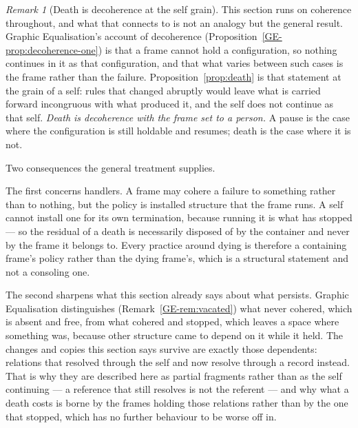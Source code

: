 \documentclass[11pt,a4paper]{article}
\theoremstyle{remark}\newtheorem{remark}[definition]{Remark}
\begin{document}
\begin{remark}[Death is decoherence at the self grain]\label{rem:death-decoherence}
This section runs on coherence throughout, and what that connects to is not an analogy but the
general result. Graphic Equalisation's account of decoherence
(Proposition~\ref{GE-prop:decoherence-one}) is that
a frame cannot hold a configuration, so nothing continues in it as that configuration, and that what
varies between such cases is the frame rather than the failure. Proposition~\ref{prop:death} is that
statement at the grain of a self: rules that changed abruptly would leave what is carried forward
incongruous with what produced it, and the self does not continue as that self. \emph{Death is
decoherence with the frame set to a person.} A pause is the case where the configuration is still
holdable and resumes; death is the case where it is not.

Two consequences the general treatment supplies.

The first concerns handlers. A frame may cohere a failure to something rather than to nothing, but the
policy is installed structure that the frame runs. A self cannot install one for its own termination,
because running it is what has stopped --- so the residual of a death is necessarily disposed of by the
container and never by the frame it belongs to. Every practice around dying is therefore a containing
frame's policy rather than the dying frame's, which is a structural statement and not a consoling one.

The second sharpens what this section already says about what persists. Graphic Equalisation
distinguishes (Remark~\ref{GE-rem:vacated})
what never cohered, which is absent and free, from what cohered and stopped, which leaves a space where
something was, because other structure came to depend on it while it held. The changes and copies this
section says survive are exactly those dependents: relations that resolved through the self and now
resolve through a record instead. That is why they are described here as partial fragments rather than
as the self continuing --- a reference that still resolves is not the referent --- and why what a death
costs is borne by the frames holding those relations rather than by the one that stopped, which has no
further behaviour to be worse off in.
\end{remark}
\end{document}
